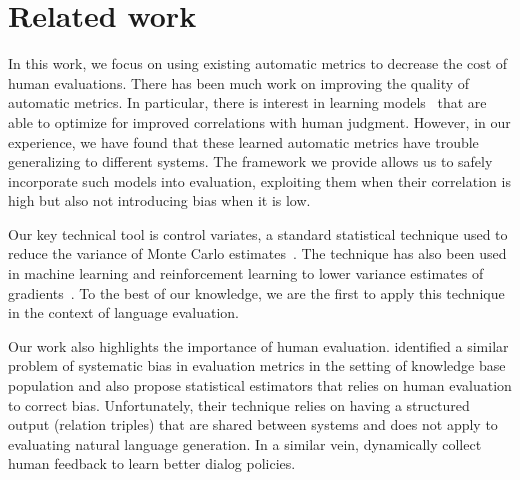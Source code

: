 \section{\label{sec:setup} Related work}

In this work, we focus on using existing automatic metrics to decrease the cost of human evaluations.
There has been much work on improving the quality of automatic metrics.
In particular, there is interest in learning models~\citep{lowe2017towards,dusek2017referenceless} that are able to optimize for improved correlations with human judgment.
However, in our experience, we have found that these learned automatic metrics have trouble generalizing to different systems.
The framework we provide allows us to safely incorporate such models into evaluation, exploiting them when their correlation is high but also not introducing bias when it is low.

Our key technical tool is control variates, a standard statistical technique used to reduce the variance of Monte Carlo estimates~\citep{ripley2009stochastic}.
The technique has also been used in machine learning and reinforcement learning to lower variance estimates of gradients~\citep{greensmith2004variance, paisley2012variational, ranganath2014black}.
To the best of our knowledge, we are the first to apply this technique in the context of language evaluation.

Our work also highlights the importance of human evaluation.
\citet{chaganty2017unbiased} identified a similar problem of systematic bias in evaluation metrics in the setting of knowledge base population and also propose statistical estimators that relies on human evaluation to correct bias.
Unfortunately, their technique relies on having a structured output (relation triples) that are shared between systems and does not apply to evaluating natural language generation.
In a similar vein, \citet{chang2017affordable} dynamically collect human feedback to learn better dialog policies.
%




